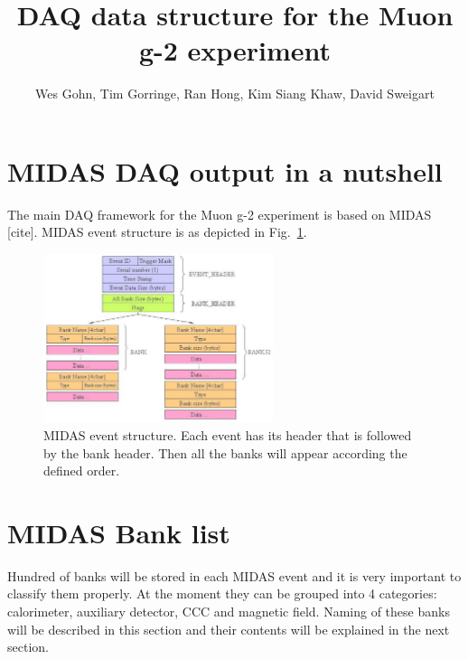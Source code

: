 

\author{Wes Gohn, Tim Gorringe, Ran Hong, Kim Siang Khaw, David Sweigart}
\title{\textbf{DAQ data structure for the Muon g-2 experiment}}


\maketitle


\tableofcontents
\newpage

\section{MIDAS DAQ output in a nutshell}
The main DAQ framework for the Muon g-2 experiment is based on MIDAS [cite]. 
MIDAS event structure is as depicted in Fig.~\ref{fig:MIDASEventStructure}.

\begin{figure}[htbp]
\centering
\includegraphics[width=0.6\textwidth]{pics/MIDASEventStructure.pdf} 
\caption{MIDAS event structure. Each event has its header that is followed by the bank header. Then all the banks will appear according the defined order.}\label{fig:MIDASEventStructure}
\end{figure}


\section{MIDAS Bank list}

Hundred of banks will be stored in each MIDAS event and it is very important to classify them properly. At the moment they can be grouped into 4 categories: calorimeter, auxiliary detector, CCC and magnetic field. Naming of these banks will be described in this section and their contents will be explained in the next section.

